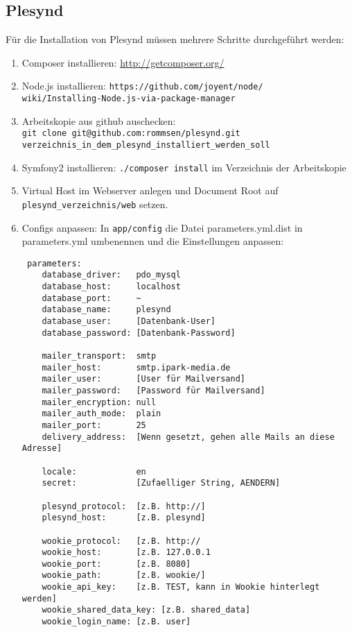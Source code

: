 \subsection*{Plesynd}
Für die Installation von Plesynd müssen mehrere Schritte durchgeführt werden:
\begin{enumerate}
 \item Composer installieren: \url{http://getcomposer.org/}
 \item Node.js installieren: \texttt{https://github.com/joyent/node/}\\
 \texttt{wiki/Installing-Node.js-via-package-manager}
 \item Arbeitskopie aus github auschecken:\\ \texttt{git clone git@github.com:rommsen/plesynd.git}\\
 \texttt{verzeichnis\_in\_dem\_plesynd\_installiert\_werden\_soll}
 \item Symfony2 installieren: \texttt{./composer install} im Verzeichnis der Arbeitskopie
 \item Virtual Host im Webserver anlegen und Document Root auf \\
 \texttt{plesynd\_verzeichnis/web} setzen.
 \item Configs anpassen: In \texttt{app/config} die Datei parameters.yml.dist in parameters.yml umbenennen und die Einstellungen anpassen: 
 \begin{lstlisting}
 parameters:
    database_driver:   pdo_mysql
    database_host:     localhost
    database_port:     ~
    database_name:     plesynd
    database_user:     [Datenbank-User]
    database_password: [Datenbank-Password]

    mailer_transport:  smtp
    mailer_host:       smtp.ipark-media.de
    mailer_user:       [User für Mailversand]
    mailer_password:   [Password für Mailversand]
    mailer_encryption: null
    mailer_auth_mode:  plain
    mailer_port:       25
    delivery_address:  [Wenn gesetzt, gehen alle Mails an diese Adresse]

    locale:            en
    secret:            [Zufaelliger String, AENDERN]

    plesynd_protocol:  [z.B. http://] 
    plesynd_host:      [z.B. plesynd]

    wookie_protocol:   [z.B. http://
    wookie_host:       [z.B. 127.0.0.1
    wookie_port:       [z.B. 8080]
    wookie_path:       [z.B. wookie/]
    wookie_api_key:    [z.B. TEST, kann in Wookie hinterlegt werden]
    wookie_shared_data_key: [z.B. shared_data]
    wookie_login_name: [z.B. user]
 \end{lstlisting}


\end{enumerate}
